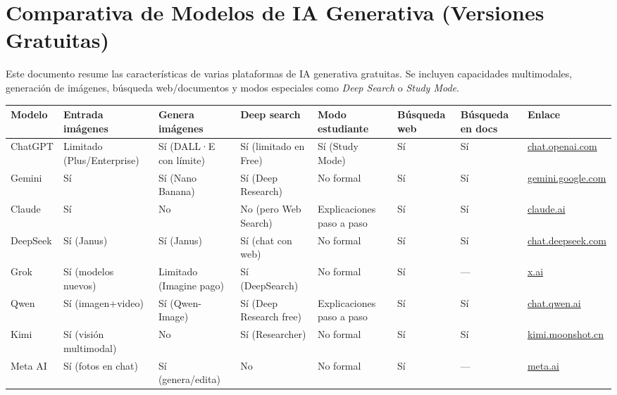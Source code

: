 \documentclass[a4paper,10pt]{article}
\begin{document}
\section*{Comparativa de Modelos de IA Generativa (Versiones Gratuitas)}

Este documento resume las características de varias plataformas de IA generativa gratuitas.  
Se incluyen capacidades multimodales, generación de imágenes, búsqueda web/documentos y modos especiales como \textit{Deep Search} o \textit{Study Mode}.

\vspace{0.5cm}

\begin{tabularx}{\textwidth}{|>{\raggedright\arraybackslash}X|
>{\centering\arraybackslash}m{2.5cm}|
>{\centering\arraybackslash}m{2.5cm}|
>{\centering\arraybackslash}m{2.5cm}|
>{\centering\arraybackslash}m{2.5cm}|
>{\centering\arraybackslash}m{2.5cm}|
>{\centering\arraybackslash}m{2.5cm}|
>{\raggedright\arraybackslash}X|}
\hline
\rowcolor{blue!40} 
\textbf{Modelo} & \textbf{Entrada imágenes} & \textbf{Genera imágenes} & \textbf{Deep search} & \textbf{Modo estudiante} & \textbf{Búsqueda web} & \textbf{Búsqueda en docs} & \textbf{Enlace} \\
\hline
ChatGPT & Limitado (Plus/Enterprise) & Sí (DALL·E con límite) & Sí (limitado en Free) & Sí (Study Mode) & Sí & Sí & \href{https://chat.openai.com}{chat.openai.com} \\
\hline
Gemini & Sí & Sí (Nano Banana) & Sí (Deep Research) & No formal & Sí & Sí & \href{https://gemini.google.com}{gemini.google.com} \\
\hline
Claude & Sí & No & No (pero Web Search) & Explicaciones paso a paso & Sí & Sí & \href{https://claude.ai}{claude.ai} \\
\hline
DeepSeek & Sí (Janus) & Sí (Janus) & Sí (chat con web) & No formal & Sí & Sí & \href{https://chat.deepseek.com}{chat.deepseek.com} \\
\hline
Grok & Sí (modelos nuevos) & Limitado (Imagine pago) & Sí (DeepSearch) & No formal & Sí & — & \href{https://x.ai}{x.ai} \\
\hline
Qwen & Sí (imagen+video) & Sí (Qwen-Image) & Sí (Deep Research free) & Explicaciones paso a paso & Sí & Sí & \href{https://chat.qwen.ai}{chat.qwen.ai} \\
\hline
Kimi & Sí (visión multimodal) & No & Sí (Researcher) & No formal & Sí & Sí & \href{https://kimi.moonshot.cn}{kimi.moonshot.cn} \\
\hline
Meta AI & Sí (fotos en chat) & Sí (genera/edita) & No & No formal & Sí & — & \href{https://www.meta.ai}{meta.ai} \\
\hline
\end{tabularx}
\end{document}
